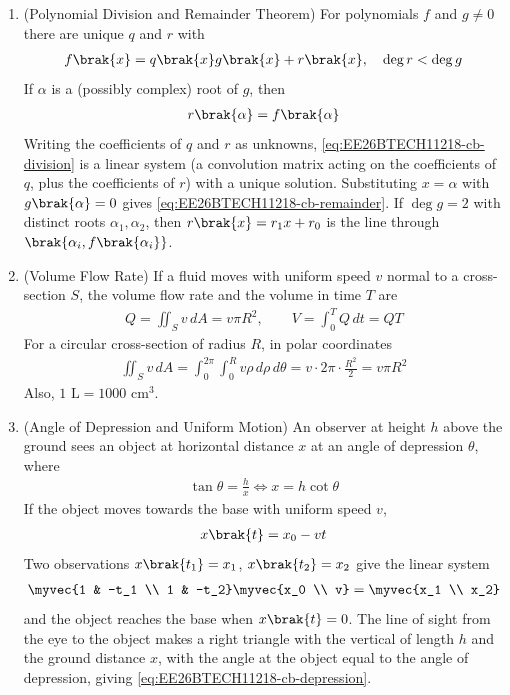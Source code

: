 \begin{enumerate}[label=\thesubsection.\arabic*, ref=\thesubsection.\theenumi,itemsep=1.5em]
\item (Polynomial Division and Remainder Theorem) For polynomials $f$ and $g\ne0$ there are unique $q$ and $r$ with
\begin{align}
f\brak{x} = q\brak{x}g\brak{x} + r\brak{x}, \quad \deg r < \deg g
\label{eq:EE26BTECH11218-cb-division}
\end{align}
If $\alpha$ is a (possibly complex) root of $g$, then
\begin{align}
r\brak{\alpha} = f\brak{\alpha}
\label{eq:EE26BTECH11218-cb-remainder}
\end{align}
\solution Writing the coefficients of $q$ and $r$ as unknowns, \eqref{eq:EE26BTECH11218-cb-division} is a linear system (a convolution matrix acting on the coefficients of $q$, plus the coefficients of $r$) with a unique solution. Substituting $x=\alpha$ with $g\brak{\alpha}=0$ gives \eqref{eq:EE26BTECH11218-cb-remainder}. If $\deg g = 2$ with distinct roots $\alpha_1,\alpha_2$, then $r\brak{x}=r_1x+r_0$ is the line through $\brak{\alpha_i, f\brak{\alpha_i}}$.

\item (Volume Flow Rate) If a fluid moves with uniform speed $v$ normal to a cross-section $S$, the volume flow rate and the volume in time $T$ are
\begin{align}
Q = \iint_{S} v\,dA = v\pi R^2, \qquad V = \int_{0}^{T} Q\,dt = QT
\label{eq:EE26BTECH11218-cb-flux}
\end{align}
\solution For a circular cross-section of radius $R$, in polar coordinates
\begin{align}
\iint_S v\,dA = \int_0^{2\pi}\int_0^R v\rho\,d\rho\,d\theta = v\cdot 2\pi\cdot\frac{R^2}{2} = v\pi R^2
\end{align}
Also, $1\text{ L} = 1000\text{ cm}^3$.

\item (Angle of Depression and Uniform Motion) An observer at height $h$ above the ground sees an object at horizontal distance $x$ at an angle of depression $\theta$, where
\begin{align}
\tan\theta = \frac{h}{x} \iff x = h\cot\theta
\label{eq:EE26BTECH11218-cb-depression}
\end{align}
If the object moves towards the base with uniform speed $v$,
\begin{align}
x\brak{t} = x_0 - vt
\label{eq:EE26BTECH11218-cb-uniform}
\end{align}
Two observations $x\brak{t_1}=x_1$, $x\brak{t_2}=x_2$ give the linear system
\begin{align}
\myvec{1 & -t_1 \\ 1 & -t_2}\myvec{x_0 \\ v} = \myvec{x_1 \\ x_2}
\label{eq:EE26BTECH11218-cb-uniform-sys}
\end{align}
and the object reaches the base when $x\brak{t}=0$.
\solution The line of sight from the eye to the object makes a right triangle with the vertical of length $h$ and the ground distance $x$, with the angle at the object equal to the angle of depression, giving \eqref{eq:EE26BTECH11218-cb-depression}.
\end{enumerate}
